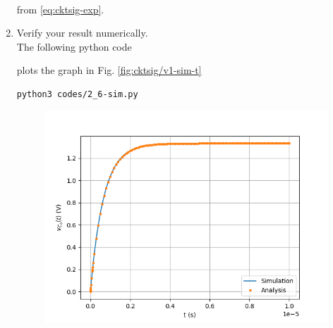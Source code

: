 \documentclass[journal,12pt,twocolumn]{IEEEtran}
\renewcommand\thesection{\arabic{section}}
\begin{document}
\begin{enumerate}[label=\arabic*.,ref=\thesection.\theenumi]
\begin{align}
\end{align}
from 
			\eqref{eq:cktsig-exp}.
\item Verify your result numerically. 
	\\
	\solution 
The following python code 

 plots the graph in Fig. 
    \ref{fig:cktsig/v1-sim-t}
\begin{lstlisting}
python3 codes/2_6-sim.py
\end{lstlisting}
\begin{figure}[!htb]
	\centering
    \includegraphics[width=\columnwidth]{cktsig/figs/2_6-sim.png}

\end{figure}
\end{enumerate}
\end{document}
